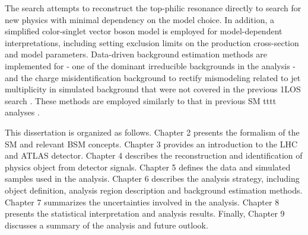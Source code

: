 \documentclass[../thesis.tex]{subfiles}
\begin{document}
The search attempts to reconstruct the top-philic resonance directly to search for new physics with minimal dependency on the model choice. In addition, a simplified color-singlet vector boson model \citep{theory:ttZp} is employed for model-dependent interpretations, including setting exclusion limits on the production cross-section and model parameters. Data-driven background estimation methods are implemented for \ttW - one of the dominant irreducible backgrounds in the analysis - and the charge misidentification background to rectify mismodeling related to jet multiplicity in simulated background that were not covered in the previous \acs{1LOS} search \citep{theory:ttZp_1los}. These methods are employed similarly to that in previous \acs{SM} \acs{tttt} analyses \citep{tttt_evidence,tttt_obs}.

This dissertation is organized as follows. Chapter 2 presents the formalism of the \acs{SM} and relevant \acs{BSM} concepts. Chapter 3 provides an introduction to the \acs{LHC} and \acs{ATLAS} detector. Chapter 4 describes the reconstruction and identification of physics object from detector signals. Chapter 5 defines the data and simulated samples used in the analysis. Chapter 6 describes the analysis strategy, including object definition, analysis region description and background estimation methods. Chapter 7 summarizes the uncertainties involved in the analysis. Chapter 8 presents the statistical interpretation and analysis results. Finally, Chapter 9 discusses a summary of the analysis and future outlook.
\end{document}
